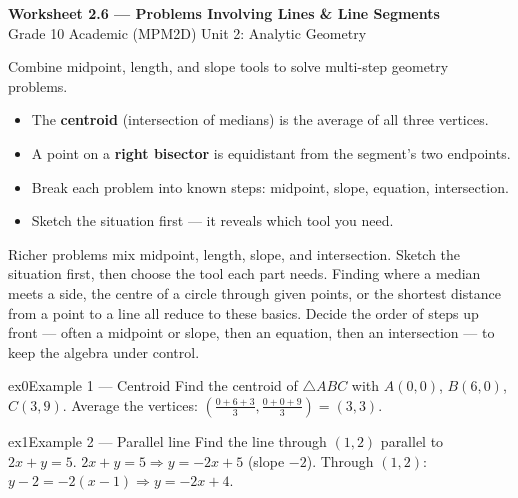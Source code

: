 \documentclass[11pt]{article}
\begin{document}
\begin{center}
{\LARGE\bfseries\color{titleblue}Worksheet 2.6 --- Problems Involving Lines \& Line Segments}\\[2pt]
{\small Grade 10 Academic (MPM2D) \textperiodcentered{} Unit 2: Analytic Geometry}
\end{center}

\begin{ideabox}
Combine midpoint, length, and slope tools to solve multi-step geometry problems.
\begin{itemize}[leftmargin=*,itemsep=2pt]
  \item The \textbf{centroid} (intersection of medians) is the average of all three vertices.
  \item A point on a \textbf{right bisector} is equidistant from the segment's two endpoints.
  \item Break each problem into known steps: midpoint, slope, equation, intersection.
  \item Sketch the situation first --- it reveals which tool you need.
\end{itemize}
\end{ideabox}

\begin{learnbox}
Richer problems mix midpoint, length, slope, and intersection. Sketch the situation first, then choose the tool each part needs.
Finding where a median meets a side, the centre of a circle through given points, or the shortest distance from a point to a line all reduce to these basics.
Decide the order of steps up front — often a midpoint or slope, then an equation, then an intersection — to keep the algebra under control.
\end{learnbox}


\begin{example}{ex0}{Example 1 --- Centroid}
Find the centroid of $\triangle ABC$ with $A(0,0)$, $B(6,0)$, $C(3,9)$.
\soln Average the vertices: $\left(\tfrac{0+6+3}{3},\tfrac{0+0+9}{3}\right)=(3,3).$
\end{example}

\begin{example}{ex1}{Example 2 --- Parallel line}
Find the line through $(1,2)$ parallel to $2x+y=5$.
\soln $2x+y=5\Rightarrow y=-2x+5$ (slope $-2$). Through $(1,2)$: $y-2=-2(x-1)\Rightarrow y=-2x+4.$
\end{example}
\end{document}
